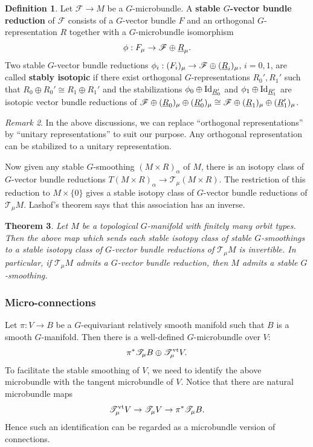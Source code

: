 \documentclass[reqno, 10pt]{amsart}
\numberwithin{equation}{section}
\numberwithin{equation}{section}
\newtheorem{thm}{Theorem}[section]
\theoremstyle{definition}
\newtheorem{defn}[thm]{Definition}
\theoremstyle{remark}
\newtheorem{rem}[thm]{Remark}
\newcommand{\beqn}{\begin{equation*}}
\newcommand{\eeqn}{\end{equation*}}
\newcommand{\ms}{\mathscr}
\newcommand{\uds}[1]{\underline{\smash{#1}}}
\begin{document}
\begin{defn}\cite[Page 300]{Lashof_1979}
Let ${\ms F} \to M$ be a $G$-microbundle. A {\bf stable $G$-vector bundle reduction} of ${\ms F}$ consists of a $G$-vector bundle $F$ and an orthogonal $G$-representation $R$ together with a $G$-microbundle isomorphism
\beqn
\phi: F_\mu \to {\ms F} \oplus \uds R_\mu.
\eeqn
Two stable $G$-vector bundle reductions $\phi_i: (F_i)_\mu \to {\ms F} \oplus (\uds R_i)_\mu$, $i = 0, 1$, are called {\bf stably isotopic} if there exist orthogonal $G$-representations $R_0', R_1'$ such that $R_0\oplus R_0' \cong R_1 \oplus R_1'$ and the stabilizations $\phi_0 \oplus {\rm Id}_{\uds R_0'}$ and $\phi_1 \oplus {\rm Id}_{\uds R_1'}$ are isotopic vector bundle reductions of ${\ms F} \oplus (\uds R_0)_\mu \oplus (\uds R_0')_\mu \cong {\ms F} \oplus (\uds R_1)_\mu \oplus (\uds R_1')_\mu$.
\end{defn}

\begin{rem}
In the above discussions, we can replace ``orthogonal representations'' by ``unitary representations'' to suit our purpose. Any orthogonal representation can be stabilized to a unitary representation.
\end{rem}


Now given any stable $G$-smoothing $(M\times R)_\alpha$ of $M$, there is an isotopy class of $G$-vector bundle reductions $T(M\times R)_\alpha \to {\ms T}_\mu( M \times R)$. The restriction of this reduction to $ M\times \{0\}$ gives a stable isotopy class of $G$-vector bundle reductions of ${\ms T}_\mu M$. Lashof's theorem says that this association has an inverse. 

\begin{thm}\cite{Lashof_1979}\label{thm_Lashof} Let $M$ be a topological $G$-manifold with finitely many orbit types. Then the above map which sends each stable isotopy class of stable $G$-smoothings to a stable isotopy class of $G$-vector bundle reductions of ${\ms T}_\mu M$ is invertible. In particular, if ${\ms T}_\mu M$ admits a $G$-vector bundle reduction, then $M$ admits a stable $G$-smoothing.
\end{thm}



\subsubsection{Micro-connections} 

Let $\pi: V \to B$ be a $G$-equivariant relatively smooth manifold such that $B$ is a smooth $G$-manifold. Then there is a well-defined $G$-microbundle over $V$:
\beqn
\pi^* {\ms T}_\mu B \oplus {\ms T}^{\rm vt}_\mu V.
\eeqn
To facilitate the stable smoothing of $V$, we need to identify the above microbundle with the tangent microbundle of $V$. Notice that there are natural microbundle maps
\beqn
{\ms T}^{\rm vt}_\mu V \to {\ms T}_\mu V \to \pi^* {\ms T}_\mu B.
\eeqn
Hence such an identification can be regarded as a microbundle version of connections.
\end{document}
